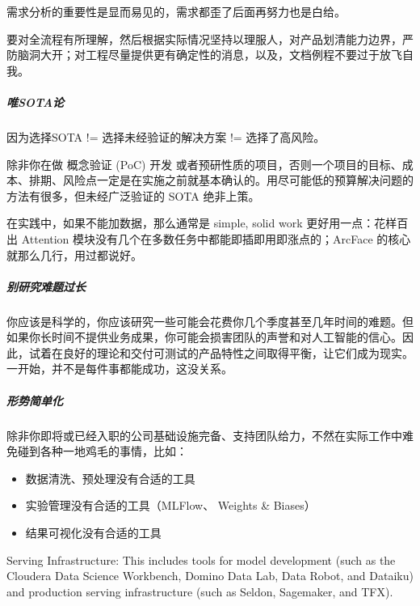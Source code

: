 \documentclass[letterpaper,10pt,english]{sphinxmanual}
\begin{document}
需求分析的重要性是显而易见的，需求都歪了后面再努力也是白给。

要对全流程有所理解，然后根据实际情况坚持以理服人，对产品划清能力边界，严防脑洞大开；对工程尽量提供更有确定性的消息，以及，文档例程不要过于放飞自我。


\subparagraph{唯SOTA论}
\label{\detokenize{chapter_introduction/AI_PM:sota}}
因为选择SOTA != 选择未经验证的解决方案 != 选择了高风险。

除非你在做 概念验证 (PoC) 开发
或者预研性质的项目，否则一个项目的目标、成本、排期、风险点一定是在实施之前就基本确认的。用尽可能低的预算解决问题的方法有很多，但未经广泛验证的
SOTA 绝非上策。

在实践中，如果不能加数据，那么通常是 simple, solid work
更好用一点：花样百出 Attention
模块没有几个在多数任务中都能即插即用即涨点的；ArcFace
的核心就那么几行，用过都说好。


\subparagraph{别研究难题过长}
\label{\detokenize{chapter_introduction/AI_PM:id31}}
你应该是科学的，你应该研究一些可能会花费你几个季度甚至几年时间的难题。但如果你长时间不提供业务成果，你可能会损害团队的声誉和对人工智能的信心。因此，试着在良好的理论和交付可测试的产品特性之间取得平衡，让它们成为现实。一开始，并不是每件事都能成功，这没关系。


\subparagraph{形势简单化}
\label{\detokenize{chapter_introduction/AI_PM:id32}}
除非你即将或已经入职的公司基础设施完备、支持团队给力，不然在实际工作中难免碰到各种一地鸡毛的事情，比如：
\begin{itemize}
\item {} 
数据清洗、预处理没有合适的工具

\item {} 
实验管理没有合适的工具（MLFlow、 Weights \& Biases）

\item {} 
结果可视化没有合适的工具

\end{itemize}

Serving Infrastructure: This includes tools for model development (such
as the Cloudera Data Science Workbench, Domino Data Lab, Data Robot, and
Dataiku) and production serving infrastructure (such as Seldon,
Sagemaker, and TFX).
%
\begin{footnote}[300]\sphinxAtStartFootnote
{}
%
\end{footnote}
\end{document}
